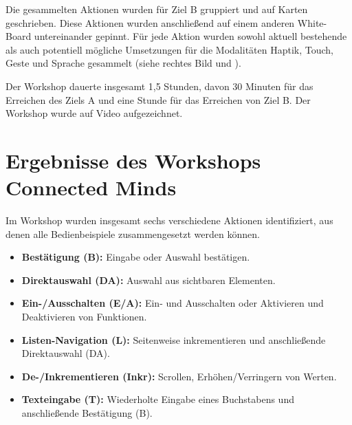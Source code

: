 Die gesammelten Aktionen wurden für Ziel B gruppiert und auf Karten geschrieben.
Diese Aktionen wurden anschließend auf einem anderen White-Board untereinander gepinnt. 
Für jede Aktion wurden sowohl aktuell bestehende als auch potentiell mögliche Umsetzungen für die Modalitäten Haptik, Touch, Geste und Sprache gesammelt (siehe  rechtes Bild und ). 

Der Workshop dauerte insgesamt 1,5 Stunden, davon 30 Minuten für das Erreichen des Ziels A und eine Stunde für das Erreichen von Ziel B. 
Der Workshop wurde auf Video aufgezeichnet.
\section[Ergebnisse des Workshops]{Ergebnisse des Workshops Connected Minds}
Im Workshop wurden insgesamt sechs verschiedene Aktionen identifiziert, aus denen alle Bedienbeispiele zusammengesetzt werden können.
\begin{itemize}
	\item \textbf{Bestätigung (B):} Eingabe oder Auswahl bestätigen.
	\item \textbf{Direktauswahl (DA):} Auswahl aus sichtbaren Elementen.
	\item \textbf{Ein-/Ausschalten (E/A):} Ein- und Ausschalten oder Aktivieren und Deaktivieren von Funktionen.
	\item \textbf{Listen-Navigation (L):} Seitenweise inkrementieren und anschließende Direktauswahl (DA).
	\item \textbf{De-/Inkrementieren (Inkr):} Scrollen, Erhöhen/Verringern von Werten.
	\item \textbf{Texteingabe (T):}  Wiederholte Eingabe eines Buchstabens und anschließende Bestätigung (B).
\end{itemize}

